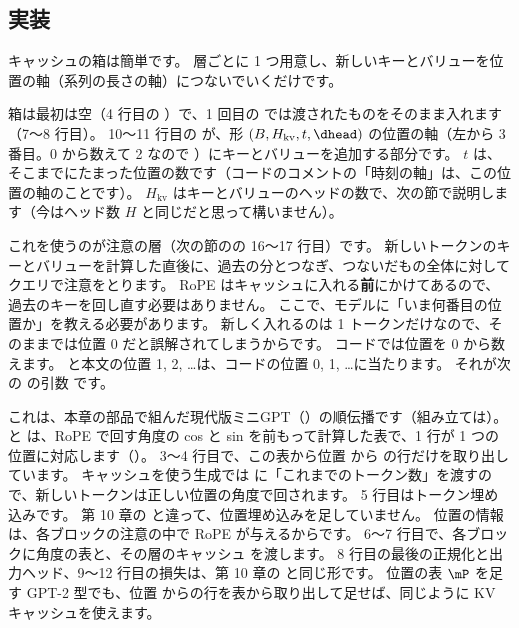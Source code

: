 \subsection*{実装}

キャッシュの箱は簡単です。
層ごとに 1 つ用意し、新しいキーとバリューを位置の軸（系列の長さの軸）につないでいくだけです。


箱は最初は空（4 行目の ）で、1 回目の  では渡されたものをそのまま入れます（7〜8 行目）。
10〜11 行目の  が、形 $(B,H_{\mathrm{kv}},t,\dhead)$ の位置の軸（左から 3 番目。0 から数えて 2 なので ）にキーとバリューを追加する部分です。
$t$ は、そこまでにたまった位置の数です（コードのコメントの「時刻の軸」は、この位置の軸のことです）。
$H_{\mathrm{kv}}$ はキーとバリューのヘッドの数で、次の節で説明します（今はヘッド数 $H$ と同じだと思って構いません）。

これを使うのが注意の層（次の節のの 16〜17 行目）です。
新しいトークンのキーとバリューを計算した直後に、過去の分とつなぎ、つないだもの全体に対してクエリで注意をとります。
RoPE はキャッシュに入れる\textbf{前}にかけてあるので、過去のキーを回し直す必要はありません。
ここで、モデルに「いま何番目の位置か」を教える必要があります。
新しく入れるのは 1 トークンだけなので、そのままでは位置 0 だと誤解されてしまうからです。
コードでは位置を 0 から数えます。
と本文の位置 1, 2, \dots は、コードの位置 0, 1, \dots に当たります。
それが次の  の引数  です。


これは、本章の部品で組んだ現代版ミニGPT（）の順伝播です（組み立ては）。
 と  は、RoPE で回す角度の cos と sin を前もって計算した表で、1 行が 1 つの位置に対応します（）。
3〜4 行目で、この表から位置  から  の行だけを取り出しています。
キャッシュを使う生成では  に「これまでのトークン数」を渡すので、新しいトークンは正しい位置の角度で回されます。
5 行目はトークン埋め込みです。
第 10 章の  と違って、位置埋め込みを足していません。
位置の情報は、各ブロックの注意の中で RoPE が与えるからです。
6〜7 行目で、各ブロックに角度の表と、その層のキャッシュ  を渡します。
8 行目の最後の正規化と出力ヘッド、9〜12 行目の損失は、第 10 章の  と同じ形です。
位置の表 $\mP$ を足す GPT-2 型でも、位置  からの行を表から取り出して足せば、同じように KV キャッシュを使えます。

